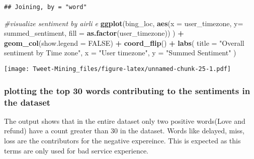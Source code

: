 \documentclass[
]{article}
\newenvironment{Shaded}{\begin{snugshade}}{\end{snugshade}}
\newcommand{\CommentTok}[1]{\textcolor[rgb]{0.56,0.35,0.01}{\textit{#1}}}
\newcommand{\DataTypeTok}[1]{\textcolor[rgb]{0.13,0.29,0.53}{#1}}
\newcommand{\KeywordTok}[1]{\textcolor[rgb]{0.13,0.29,0.53}{\textbf{#1}}}
\newcommand{\NormalTok}[1]{#1}
\newcommand{\OperatorTok}[1]{\textcolor[rgb]{0.81,0.36,0.00}{\textbf{#1}}}
\newcommand{\OtherTok}[1]{\textcolor[rgb]{0.56,0.35,0.01}{#1}}
\newcommand{\StringTok}[1]{\textcolor[rgb]{0.31,0.60,0.02}{#1}}
\begin{document}
\begin{verbatim}
## Joining, by = "word"
\end{verbatim}

\begin{Shaded}
\begin{Highlighting}[]
\CommentTok{#visualize sentiment by airli e}
\KeywordTok{ggplot}\NormalTok{(bing_loc,}
  \KeywordTok{aes}\NormalTok{(}\DataTypeTok{x =}\NormalTok{ user_timezone, }\DataTypeTok{y=}\NormalTok{ summed_sentiment, }\DataTypeTok{fill =} \KeywordTok{as.factor}\NormalTok{(user_timezone))}
\NormalTok{) }\OperatorTok{+}\StringTok{ }
\StringTok{  }\KeywordTok{geom_col}\NormalTok{(}\DataTypeTok{show.legend =} \OtherTok{FALSE}\NormalTok{) }\OperatorTok{+}
\StringTok{  }\KeywordTok{coord_flip}\NormalTok{() }\OperatorTok{+}
\StringTok{  }\KeywordTok{labs}\NormalTok{(}
    \DataTypeTok{title =} \StringTok{"Overall sentiment by Time zone"}\NormalTok{,}
    \DataTypeTok{x =} \StringTok{"User timezone"}\NormalTok{,}
    \DataTypeTok{y =} \StringTok{"Summed Sentiment"}
\NormalTok{  )}
\end{Highlighting}
\end{Shaded}

\texttt{[image: Tweet-Mining\_files/figure-latex/unnamed-chunk-25-1.pdf]}

\hypertarget{plotting-the-top-30-words-contributing-to-the-sentiments-in-the-dataset}{%
\subsubsection{plotting the top 30 words contributing to the sentiments
in the
dataset}\label{plotting-the-top-30-words-contributing-to-the-sentiments-in-the-dataset}}

The output shows that in the entire dataset only two positive words(Love
and refund) have a count greater than 30 in the dataset. Words like
delayed, miss, loss are the contributors for the negative expereince.
This is expected as this terms are only used for bad service experience.
\end{document}
